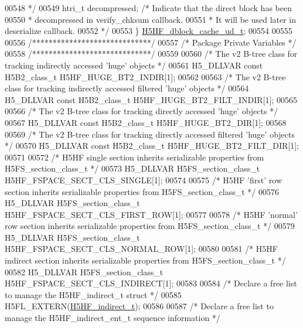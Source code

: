 \begin{DoxyCode}
00548 \textcolor{comment}{                     */}
00549     htri\_t decompressed;    \textcolor{comment}{/* Indicate that the direct block has been}
00550 \textcolor{comment}{                             * decompressed in verify\_chksum callback.}
00551 \textcolor{comment}{                             * It will be used later in deserialize callback.}
00552 \textcolor{comment}{                             */}
00553 \} \hyperlink{struct_h5_h_f__dblock__cache__ud__t}{H5HF\_dblock\_cache\_ud\_t};
00554 
00555 
00556 \textcolor{comment}{/*****************************/}
00557 \textcolor{comment}{/* Package Private Variables */}
00558 \textcolor{comment}{/*****************************/}
00559 
00560 \textcolor{comment}{/* The v2 B-tree class for tracking indirectly accessed 'huge' objects */}
00561 H5\_DLLVAR \textcolor{keyword}{const} H5B2\_class\_t H5HF\_HUGE\_BT2\_INDIR[1];
00562 
00563 \textcolor{comment}{/* The v2 B-tree class for tracking indirectly accessed filtered 'huge' objects */}
00564 H5\_DLLVAR \textcolor{keyword}{const} H5B2\_class\_t H5HF\_HUGE\_BT2\_FILT\_INDIR[1];
00565 
00566 \textcolor{comment}{/* The v2 B-tree class for tracking directly accessed 'huge' objects */}
00567 H5\_DLLVAR \textcolor{keyword}{const} H5B2\_class\_t H5HF\_HUGE\_BT2\_DIR[1];
00568 
00569 \textcolor{comment}{/* The v2 B-tree class for tracking directly accessed filtered 'huge' objects */}
00570 H5\_DLLVAR \textcolor{keyword}{const} H5B2\_class\_t H5HF\_HUGE\_BT2\_FILT\_DIR[1];
00571 
00572 \textcolor{comment}{/* H5HF single section inherits serializable properties from H5FS\_section\_class\_t */}
00573 H5\_DLLVAR H5FS\_section\_class\_t H5HF\_FSPACE\_SECT\_CLS\_SINGLE[1];
00574 
00575 \textcolor{comment}{/* H5HF 'first' row section inherits serializable properties from H5FS\_section\_class\_t */}
00576 H5\_DLLVAR H5FS\_section\_class\_t H5HF\_FSPACE\_SECT\_CLS\_FIRST\_ROW[1];
00577 
00578 \textcolor{comment}{/* H5HF 'normal' row section inherits serializable properties from H5FS\_section\_class\_t */}
00579 H5\_DLLVAR H5FS\_section\_class\_t H5HF\_FSPACE\_SECT\_CLS\_NORMAL\_ROW[1];
00580 
00581 \textcolor{comment}{/* H5HF indirect section inherits serializable properties from H5FS\_section\_class\_t */}
00582 H5\_DLLVAR H5FS\_section\_class\_t H5HF\_FSPACE\_SECT\_CLS\_INDIRECT[1];
00583 
00584 \textcolor{comment}{/* Declare a free list to manage the H5HF\_indirect\_t struct */}
00585 H5FL\_EXTERN(\hyperlink{struct_h5_h_f__indirect__t}{H5HF\_indirect\_t});
00586 
00587 \textcolor{comment}{/* Declare a free list to manage the H5HF\_indirect\_ent\_t sequence information */}

\end{DoxyCode}
